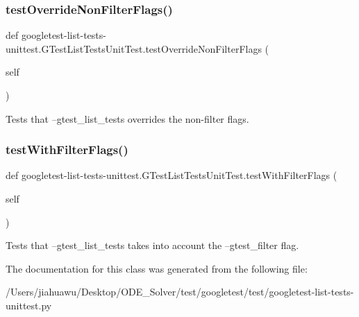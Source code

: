 \subsubsection{\texorpdfstring{test\+Override\+Non\+Filter\+Flags()}{testOverrideNonFilterFlags()}}
{\footnotesize\ttfamily def googletest-\/list-\/tests-\/unittest.\+G\+Test\+List\+Tests\+Unit\+Test.\+test\+Override\+Non\+Filter\+Flags (\begin{DoxyParamCaption}\item[{}]{self }\end{DoxyParamCaption})}

\begin{DoxyVerb}Tests that --gtest_list_tests overrides the non-filter flags.\end{DoxyVerb}
 \mbox{\label{classgoogletest-list-tests-unittest_1_1_g_test_list_tests_unit_test_adb60d2295fee8ed4af2a5ee1a32e5778}} 
\subsubsection{\texorpdfstring{test\+With\+Filter\+Flags()}{testWithFilterFlags()}}
{\footnotesize\ttfamily def googletest-\/list-\/tests-\/unittest.\+G\+Test\+List\+Tests\+Unit\+Test.\+test\+With\+Filter\+Flags (\begin{DoxyParamCaption}\item[{}]{self }\end{DoxyParamCaption})}

\begin{DoxyVerb}Tests that --gtest_list_tests takes into account the
--gtest_filter flag.\end{DoxyVerb}
 

The documentation for this class was generated from the following file\+:\begin{DoxyCompactItemize}
\item 
/\+Users/jiahuawu/\+Desktop/\+O\+D\+E\+\_\+\+Solver/test/googletest/test/googletest-\/list-\/tests-\/unittest.\+py\end{DoxyCompactItemize}
